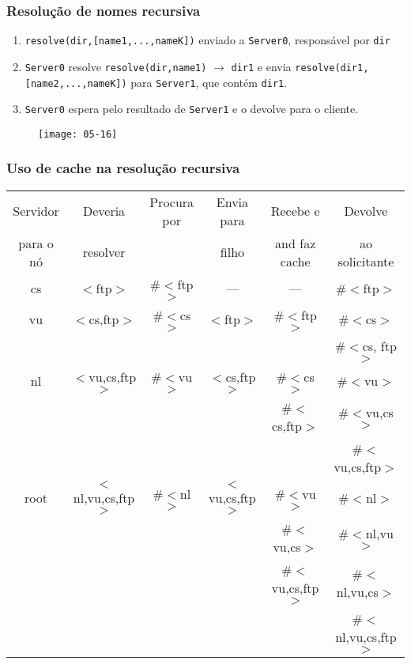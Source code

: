 \documentclass[Ligatures=TeX,table,brazil,svgnames,usetotalslideindicator,compress,10pt]{beamer}
\begin{document}
\begin{frame}
  \frametitle{Resolução de nomes recursiva}
  \begin{enumerate}
  \item \texttt{resolve(dir,[name1,...,nameK])} enviado a \texttt{Server0}, responsável por \texttt{dir}
  \item \texttt{Server0} resolve \texttt{resolve(dir,name1)} $\rightarrow$ \texttt{dir1} e envia
    \texttt{resolve(dir1,[name2,...,nameK])} para \texttt{Server1}, que contém \texttt{dir1}.
  \item \texttt{Server0} espera pelo resultado de  \texttt{Server1} e o devolve para o cliente.
  \end{enumerate}

  \begin{figure}
    \centering
    \texttt{[image: 05-16]}
  \end{figure}

\end{frame}

\begin{frame}
  \frametitle{Uso de cache na resolução recursiva}

  \begin{center}
    \sffamily\scriptsize
    \begin{minipage}{18cm}
      \renewcommand{\arraystretch}{1.2}
      \begin{tabular}{@{}|c|c|c|c|c|c|}\hline
        Servidor 		& Deveria 				& Procura por 		& Envia para 		& Recebe e 			& Devolve 				\\
        para o nó 	& resolver 				&  				& filho 			& and faz cache 		& ao solicitante 			\\ \hline
        cs 			& $<$ftp$>$ 			& \#$<$ftp$>$ 	& --- 				& --- 				& \#$<$ftp$>$ 			\\ \hline
        vu 			& $<$cs,ftp$>$ 			& \#$<$cs$>$ 	& $<$ftp$>$ 		& \#$<$ftp$>$ 		& \#$<$cs$>$			\\
 		            &  						&  				&  					&  					& \#$<$cs, ftp$>$ 		\\ \hline
        nl 			& $<$vu,cs,ftp$>$ 		& \#$<$vu$>$ 	& $<$cs,ftp$>$ 		& \#$<$cs$>$ 		& \#$<$vu$>$			\\
 		            &  						&  				&  					& \#$<$cs,ftp$>$ 	& \#$<$vu,cs$>$ 		\\
 		            &  						&  				&  					&  					& \#$<$vu,cs,ftp$>$ 	\\ \hline
        root 		& $<$nl,vu,cs,ftp$>$ 	& \#$<$nl$>$ 	& $<$vu,cs,ftp$>$ 	& \#$<$vu$>$ 		& \#$<$nl$>$			\\
 		            &  						&  				&  					& \#$<$vu,cs$>$ 	& \#$<$nl,vu$>$			\\
 		            &  						&  				&  					& \#$<$vu,cs,ftp$>$ & \#$<$nl,vu,cs$>$		\\
 		            &  						&  				&  					&  					& \#$<$nl,vu,cs,ftp$>$	\\ \hline
      \end{tabular}
    \end{minipage}
  \end{center}

\end{frame}
\end{document}
